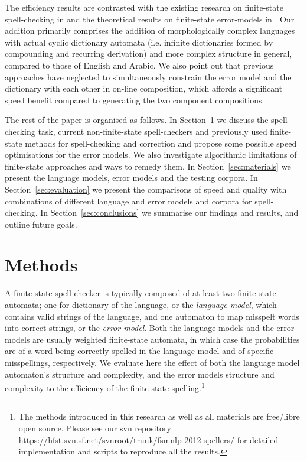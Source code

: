 \documentclass[11pt]{article}
\begin{document}
The efficiency results are contrasted with the existing research on
finite-state spell-checking in  and the theoretical
results on finite-state error-models in .  Our addition
primarily comprises the addition of morphologically complex languages with
actual cyclic dictionary automata (i.e. infinite dictionaries formed by
compounding and recurring derivation) and more complex structure in general,
compared to those of English and Arabic. We also point out that previous
approaches have neglected to simultaneously constrain the error model and the
dictionary with each other in on-line composition, which affords a significant
speed benefit compared to generating the two component compositions.

The rest of the paper is organised as follows. In Section~\ref{sec:methods} we
discuss the spell-checking task, current non-finite-state spell-checkers and
previously used finite-state methods for spell-checking and correction and
propose some possible speed optimisations for the error models.
We also investigate algorithmic limitations of finite-state approaches and
ways to remedy them. In
Section~\ref{sec:materials} we present the language models, error models and the
testing corpora. In Section~\ref{sec:evaluation} we
present the comparisons of speed and quality with combinations of different
language and error models and corpora for spell-checking. In
Section~\ref{sec:conclusions} we summarise our findings and results,
and outline future goals.


\section{Methods}
\label{sec:methods}

A finite-state spell-checker is typically composed of at least two finite-state
automata; one for dictionary of the language, or the \emph{language model},
which contains valid strings of the language, and one automaton to map misspelt
words into correct strings, or the \emph{error model}. Both the language models
and the error models are usually weighted finite-state automata, in which
case the probabilities are of a word being correctly spelled in the language
model and of specific misspellings, respectively.
We evaluate here the effect of both the language model automaton's structure
and complexity, and the error models structure and complexity to the efficiency
of the finite-state spelling.\footnote{The methods introduced in this research
as well as all materials are free/libre open source. Please see our svn
repository \url{https://hfst.svn.sf.net/svnroot/trunk/fsmnlp-2012-spellers/}
for detailed implementation and scripts to reproduce all the
results.}
\end{document}
